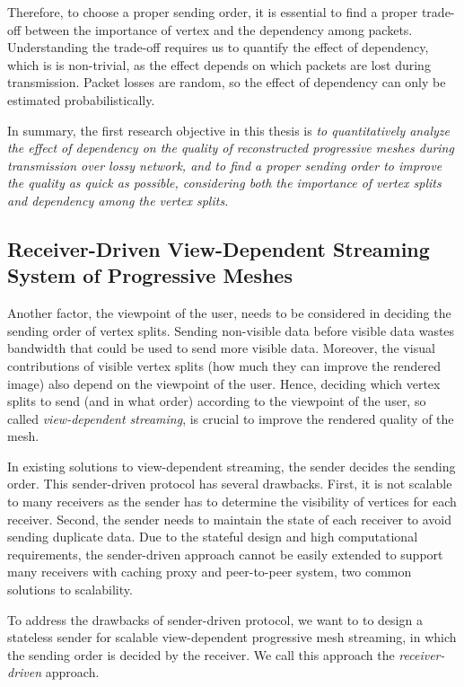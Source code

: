     Therefore, to choose a proper sending order, it is essential 
    to find a proper trade-off between the importance of vertex
    and the dependency among packets. Understanding the trade-off
    requires us to quantify the effect of dependency, 
    which is is non-trivial, as
    the effect depends on which packets are lost during transmission.
    Packet losses are random, so the effect of dependency  
    can only be estimated probabilistically.
    
    In summary, the first research objective in this thesis is
    \textit{to quantitatively analyze the effect of dependency on 
    the quality of reconstructed progressive meshes 
    during transmission over lossy network, and to find
    a proper sending order to improve the quality as quick
    as possible, considering both the importance of vertex splits
    and dependency among the vertex splits.}
    
    \subsection{Receiver-Driven View-Dependent Streaming System of Progressive Meshes}
    Another factor, the viewpoint of the user, 
    needs to be considered in deciding the sending order of vertex splits.
    Sending non-visible data before visible data wastes bandwidth
    that could be used to send more visible data. 
    Moreover, the visual contributions of visible
    vertex splits (how much they can improve the rendered image)
    also depend on the viewpoint of the user.
    Hence, deciding which vertex splits to send (and in what order)
    according to the viewpoint of the user, 
    so called \emph{view-dependent streaming}, 
    is crucial to improve the rendered quality of the mesh.
    
    In existing solutions to view-dependent streaming,  
    the sender decides the sending order. 
    This sender-driven protocol has several drawbacks. 
    First, it is not scalable to many receivers as the sender has to
    determine the visibility of vertices for each receiver. 
    Second, the sender needs to maintain
    the state of each receiver to avoid sending duplicate data. 
    Due to the stateful design and high computational requirements,
    the sender-driven approach cannot be easily extended to support 
    many receivers with caching proxy and peer-to-peer system,
    two common solutions to scalability. 

    To address the drawbacks of sender-driven protocol, we want to 
    to design a stateless sender for scalable view-dependent progressive 
    mesh streaming, in which the sending order is decided by the receiver.
    We call this approach the \textit{receiver-driven} approach.
    
